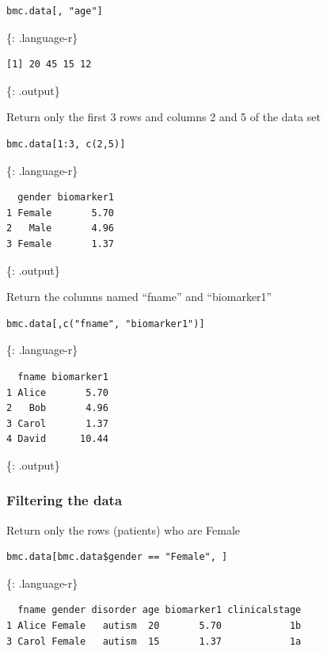 \documentclass[]{article}
\begin{document}
\begin{verbatim}
bmc.data[, "age"]
\end{verbatim}

\{: .language-r\}

\begin{verbatim}
[1] 20 45 15 12
\end{verbatim}

\{: .output\}

Return only the first 3 rows and columns 2 and 5 of the data set

\begin{verbatim}
bmc.data[1:3, c(2,5)]
\end{verbatim}

\{: .language-r\}

\begin{verbatim}
  gender biomarker1
1 Female       5.70
2   Male       4.96
3 Female       1.37
\end{verbatim}

\{: .output\}

Return the columns named ``fname'' and ``biomarker1''

\begin{verbatim}
bmc.data[,c("fname", "biomarker1")]
\end{verbatim}

\{: .language-r\}

\begin{verbatim}
  fname biomarker1
1 Alice       5.70
2   Bob       4.96
3 Carol       1.37
4 David      10.44
\end{verbatim}

\{: .output\}

\subsubsection{Filtering the data}\label{filtering-the-data}

Return only the rows (patients) who are Female

\begin{verbatim}
bmc.data[bmc.data$gender == "Female", ]
\end{verbatim}

\{: .language-r\}

\begin{verbatim}
  fname gender disorder age biomarker1 clinicalstage
1 Alice Female   autism  20       5.70            1b
3 Carol Female   autism  15       1.37            1a
\end{verbatim}
\end{document}
